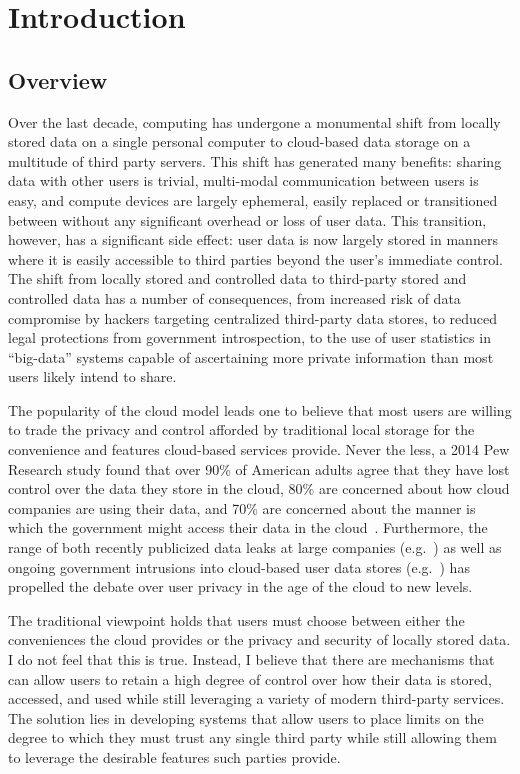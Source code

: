 \chapter{Introduction}
\label{chap:intro}

\section{Overview}
\label{chap:intro:overview}

Over the last decade, computing has undergone a monumental shift from
locally stored data on a single personal computer to cloud-based data
storage on a multitude of third party servers. This shift has
generated many benefits: sharing data with other users is trivial,
multi-modal communication between users is easy, and compute devices
are largely ephemeral, easily replaced or transitioned between without
any significant overhead or loss of user data. This transition,
however, has a significant side effect: user data is now largely
stored in manners where it is easily accessible to third parties
beyond the user's immediate control. The shift from locally stored and
controlled data to third-party stored and controlled data has a number
of consequences, from increased risk of data compromise by hackers
targeting centralized third-party data stores, to reduced legal
protections from government introspection, to the use of user
statistics in ``big-data'' systems capable of ascertaining more
private information than most users likely intend to share.

The popularity of the cloud model leads one to believe that most users
are willing to trade the privacy and control afforded by traditional
local storage for the convenience and features cloud-based services
provide. Never the less, a 2014 Pew Research study found that over
90\% of American adults agree that they have lost control over the
data they store in the cloud, 80\% are concerned about how cloud
companies are using their data, and 70\% are concerned about the
manner is which the government might access their data in the
cloud~\cite{pew-privsec14}. Furthermore, the range of both recently
publicized data leaks at large companies
(e.g.~\cite{apple-icloudleak}) as well as ongoing government
intrusions into cloud-based user data stores
(e.g.~\cite{greenwald-prism}) has propelled the debate over user
privacy in the age of the cloud to new levels.

The traditional viewpoint holds that users must choose between either
the conveniences the cloud provides or the privacy and security of
locally stored data. I do not feel that this is true. Instead, I
believe that there are mechanisms that can allow users to retain a
high degree of control over how their data is stored, accessed, and
used while still leveraging a variety of modern third-party
services. The solution lies in developing systems that allow users to
place limits on the degree to which they must trust any single third
party while still allowing them to leverage the desirable features such
parties provide.

